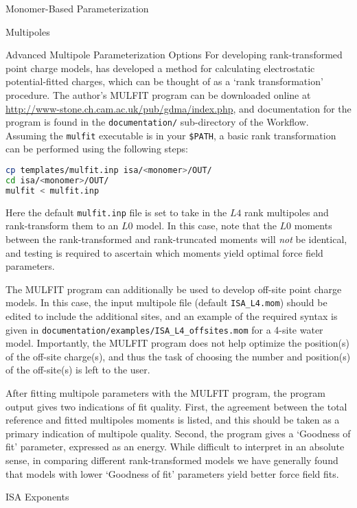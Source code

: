 \begin{section}{Monomer-Based Parameterization}
\begin{subsection}{Multipoles}
\begin{subsubsection}{Advanced Multipole Parameterization Options}
For developing rank-transformed point charge models, \citeauthor{Ferenczy1997} has
developed a method for calculating electrostatic potential-fitted charges,
which can be thought of as a `rank transformation' procedure. The author's
MULFIT program can be 
downloaded online at
\url{http://www-stone.ch.cam.ac.uk/pub/gdma/index.php}, and documentation for
the program is found in the \verb|documentation/| sub-directory of the
Workflow. Assuming the \verb|mulfit| executable is in your \verb|$PATH|, a
basic rank transformation can be performed using the following steps:
%
\begin{lstlisting}[language=bash]
cp templates/mulfit.inp isa/<monomer>/OUT/
cd isa/<monomer>/OUT/
mulfit < mulfit.inp
\end{lstlisting}
%
Here the default \verb|mulfit.inp| file is set to take in the $L4$ rank
multipoles and rank-transform them to an $L0$ model. In this case, note that
the $L0$ moments between the rank-transformed and rank-truncated moments will
\emph{not} be identical, and testing is required to ascertain which
moments yield optimal force field parameters.

The MULFIT program can additionally be used to develop off-site point charge models. In
this case, the input multipole file (default \verb|ISA_L4.mom|) should be
edited to include the additional sites, and an example of the required syntax
is given in \verb|documentation/examples/ISA_L4_offsites.mom| for a
4-site water model. Importantly, the MULFIT program does not help
optimize the position(s) of the off-site charge(s), and thus the task of choosing
the number and position(s) of the off-site(s) is left to
the user.

After fitting multipole parameters with the MULFIT program, the program output
gives two indications of fit quality. First, the agreement between the total
reference and fitted multipoles moments is listed, and this should be taken as
a primary indication of multipole quality. Second, the program gives a
`Goodness of fit' parameter, expressed as an energy. While difficult to
interpret in an absolute sense, in comparing different rank-transformed models
we have generally found that models with lower `Goodness of fit' parameters
yield better force field fits.

\end{subsubsection}
\end{subsection}

\begin{subsection}{ISA Exponents}
\label{sec:workflow-exponents}


\end{subsection}
\end{section}
